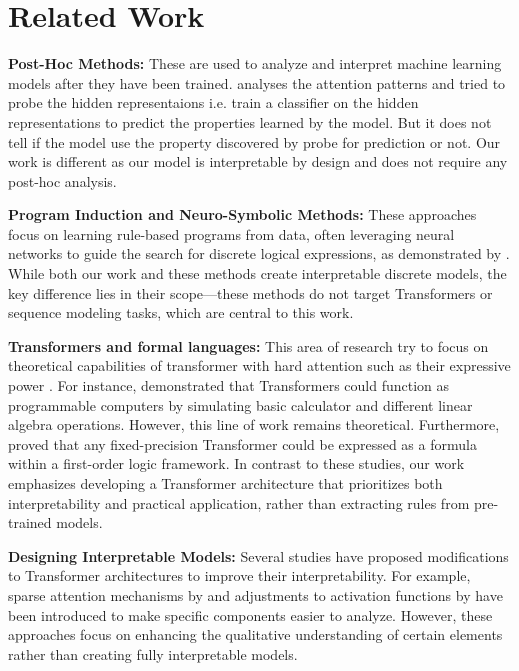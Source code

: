 
\section{Related Work}
\label{ch:related-work}

\textbf{Post-Hoc Methods:} These are used to analyze and interpret machine learning models after they have been trained. \textcite{clark2019does} analyses the attention patterns and \textcite{tenney2019bert,belinkov2022probing} tried to probe the hidden representaions i.e. train a classifier on the hidden representations to predict the properties learned by the model. But it does not tell if the model use the property discovered by probe for prediction or not. Our work is different as our model is interpretable by design and does not require any post-hoc analysis.

\textbf{Program Induction and Neuro-Symbolic Methods:} These approaches focus on learning rule-based programs from data, often leveraging neural networks to guide the search for discrete logical expressions, as demonstrated by \textcite{wang2021scalable,petersen2022deep}. While both our work and these methods create interpretable discrete models, the key difference lies in their scope—these methods do not target Transformers or sequence modeling tasks, which are central to this work.  


\textbf{Transformers and formal languages:} This area of research try to focus on theoretical capabilities of transformer with hard attention such as their expressive power \cite{hao2022formal, merrill2022saturated}. For instance, \textcite{merrill2022saturated} demonstrated that Transformers could function as programmable computers by simulating basic calculator and different linear algebra operations. However, this line of work remains theoretical. Furthermore, \textcite{merrill2024logic} proved that any fixed-precision Transformer could be expressed as a formula within a first-order logic framework. In contrast to these studies, our work emphasizes developing a Transformer architecture that prioritizes both interpretability and practical application, rather than extracting rules from pre-trained models.

\textbf{Designing Interpretable Models:} Several studies have proposed modifications to Transformer architectures to improve their interpretability. For example, sparse attention mechanisms by \textcite{zhang2021sparse} and adjustments to activation functions by \textcite{elhage2022solu} have been introduced to make specific components easier to analyze. However, these approaches focus on enhancing the qualitative understanding of certain elements rather than creating fully interpretable models.
